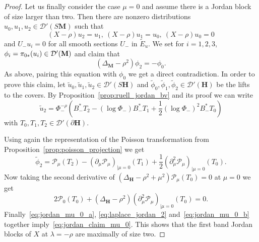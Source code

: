 \documentclass[AHL, Unicode, longabstracts, published]{cedram}
\newcommand{\bfh}{\mathbf{H}}
\newcommand{\bfm}{\mathbf{M}}
\newcommand{\pl}{\partial}
\newcommand{\til}{\widetilde}
\begin{document}
\begin{proof}
Let us finally consider the case $\mu = 0$ and assume there is a Jordan block of size larger than two. Then there are nonzero distributions $u_0,u_1,u_2 \in \mathcal D'(S{\bfm})$ such that
\[
(X -\rho)u_2= u_1,\:(X -\rho)u_1= u_0,\:(X -\rho)u_0= 0
\]
and $U_- u_{i}=0$ for all smooth sections $U_-$ in $\til{E}_u$. We set for $i=1,2,3$, $\phi_i = \pi_{0*}(u_i)\linebreak\in \mathcal D'({\bfm})$ and claim that
\begin{equation}\label{eq:jordan_claim_mu_0}
\left(\Delta_{\bfm} -\rho^2\right)\phi_2= -\phi_0.
\end{equation}
As above, pairing this equation with $\phi_0$ we get a direct contradiction. In order to prove this claim, let $\til u_0, \til u_1,\til u_2 \in \mathcal D'(S{\bfh})$ and $\til \phi_0, \til \phi_1, \til \phi_2 \in \mathcal D' ({\bfh})$ be the lifts to the covers. By Proposition~\ref{prop:ruell_jordan_bv} and its proof we can write
\[
\til u_2 = \Phi_-^{-\rho}\left(B_-^*T_2 - (\log \Phi_-) B_-^*T_1+ \frac{1}{2} (\log \Phi_-)^2B_-^*T_0\right)
\]
with $T_0, T_1, T_2\in \mathcal D'(\pl{\bfh})$.

Using again the representation of the Poisson transformation from Proposition~\ref{prop:poisson_projection} we get
\begin{equation}\label{eq:jordan_mu_0_a}
\til \phi_2 = \mathcal P_\mu (T_2) - (\partial_\mu \mathcal P_\mu)_{|\mu=0}(T_1) +\frac{1}{2} \left(\partial_\mu^2 \mathcal P_\mu\right)_{|\mu=0}(T_0).
\end{equation}
Now taking the second derivative of $(\Delta_{\bfh} - \rho^2+\mu^2)\mathcal P_\mu(T_0)=0$ at $\mu=0$ we get
\begin{equation}\label{eq:jordan_mu_0_b}
2\mathcal P_0(T_0) + \left(\Delta_{{\bfh}} - \rho^2\right) \left(\partial_\mu^2\mathcal P_\mu\right)_{|\mu=0}(T_0)=0.
\end{equation}
Finally~\eqref{eq:jordan_mu_0_a}, \eqref{eq:laplace_jordan_2} and~\eqref{eq:jordan_mu_0_b} together imply~\eqref{eq:jordan_claim_mu_0}. This shows that the first band Jordan blocks of $X$ at $\lambda=-\rho$ are maximally of size two.


\end{proof}
\end{document}
